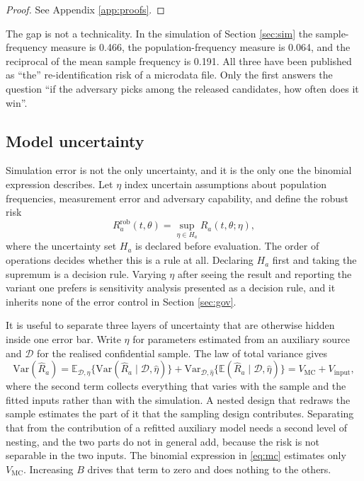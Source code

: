 \documentclass[11pt,a4paper]{article}
\theoremstyle{plain}
\theoremstyle{definition}
\newcommand{\E}{\mathbb{E}}
\begin{document}
\begin{proof}
See Appendix \ref{app:proofs}.
\end{proof}

The gap is not a technicality. In the simulation of Section \ref{sec:sim} the
sample-frequency measure is 0.466, the population-frequency measure is 0.064,
and the reciprocal of the mean sample frequency is 0.191. All three have been
published as ``the'' re-identification risk of a microdata file. Only the first
answers the question ``if the adversary picks among the released candidates,
how often does it win''.

\subsection{Model uncertainty}

Simulation error is not the only uncertainty, and it is the only one the
binomial expression describes. Let $\eta$ index uncertain assumptions about population frequencies,
measurement error and adversary capability, and define the robust risk
\begin{equation}
R_a^{\mathrm{rob}}(t, \theta) = \sup_{\eta \in H_a} R_a(t, \theta; \eta) ,
\label{eq:rob}
\end{equation}
where the uncertainty set $H_a$ is declared before evaluation. The order of operations decides whether this is a rule at all. Declaring $H_a$
first and taking the supremum is a decision rule. Varying $\eta$ after seeing the result and reporting the
variant one prefers is sensitivity analysis presented as a decision rule, and
it inherits none of the error control in Section \ref{sec:gov}.

It is useful to separate three layers of uncertainty that are otherwise hidden
inside one error bar. Write $\widehat\eta$ for parameters estimated from an
auxiliary source and $\mathcal{D}$ for the realised confidential sample. The law
of total variance gives
\begin{equation}
\mathrm{Var}(\widehat R_a)
=\E_{\mathcal{D},\widehat\eta}
  \{\mathrm{Var}(\widehat R_a\mid\mathcal{D},\widehat\eta)\}
 +\mathrm{Var}_{\mathcal{D},\widehat\eta}
  \{\E(\widehat R_a\mid\mathcal{D},\widehat\eta)\}
= V_{\mathrm{MC}} + V_{\mathrm{input}} ,
\label{eq:var-decomp}
\end{equation}
where the second term collects everything that varies with the sample and the
fitted inputs rather than with the simulation. A nested design that redraws the sample estimates the part of it that the sampling
design contributes. Separating that from the contribution of a refitted auxiliary
model needs a second level of nesting, and the two parts do not in general add,
because the risk is not separable in the two inputs.
The binomial expression in \eqref{eq:mc} estimates only $V_{\mathrm{MC}}$.
Increasing $B$ drives that term to zero and does nothing to the others.
\end{document}
